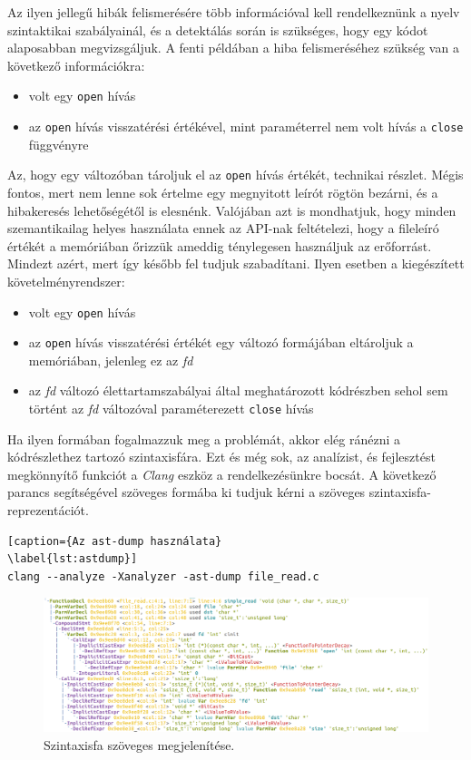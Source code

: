 \documentclass[a4paper,12pt]{report}
\begin{document}
Az ilyen jellegű hibák felismerésére több információval kell rendelkeznünk a nyelv szintaktikai szabályainál, és a detektálás során is szükséges, hogy egy kódot alaposabban megvizsgáljuk. A fenti példában a hiba felismeréséhez szükség van a következő információkra:
\begin{itemize}
\item volt egy \texttt{open} hívás
\item az \texttt{open} hívás visszatérési értékével, mint paraméterrel nem volt hívás a \texttt{close} függvényre
\end{itemize}
Az, hogy egy változóban tároljuk el az \texttt{open} hívás értékét, technikai részlet. Mégis fontos, mert nem lenne sok értelme egy megnyitott leírót rögtön bezárni, és a hibakeresés lehetőségétől is elesnénk.
Valójában azt is mondhatjuk, hogy minden szemantikailag helyes használata ennek az API-nak feltételezi, hogy a fileleíró értékét a memóriában őrizzük ameddig ténylegesen használjuk az erőforrást. Mindezt azért, mert így később fel tudjuk szabadítani. Ilyen esetben a kiegészített követelményrendszer:
\begin{itemize}
\item volt egy \texttt{open} hívás
\item az \texttt{open} hívás visszatérési értékét egy változó formájában eltároljuk a memóriában, jelenleg ez az \emph{fd}
\item az \emph{fd} változó élettartamszabályai által meghatározott kódrészben sehol sem történt az \emph{fd} változóval paraméterezett \texttt{close} hívás
\end{itemize}
Ha ilyen formában fogalmazzuk meg a problémát, akkor elég ránézni a kódrészlethez tartozó szintaxisfára. Ezt és még sok, az analízist, és fejlesztést megkönnyítő funkciót a \emph{Clang} eszköz a rendelkezésünkre bocsát. A következő parancs segítségével szöveges formába ki tudjuk kérni a szöveges szintaxisfa-reprezentációt.
\begin{lstlisting}[caption={Az ast-dump használata}
\label{lst:astdump}]
clang --analyze -Xanalyzer -ast-dump file_read.c
\end{lstlisting}

\begin{figure}[h]
\centering
\includegraphics[scale=0.27]{astdumptomorrow.png}
\caption{Szintaxisfa szöveges megjelenítése.}
\end{figure}
\end{document}

